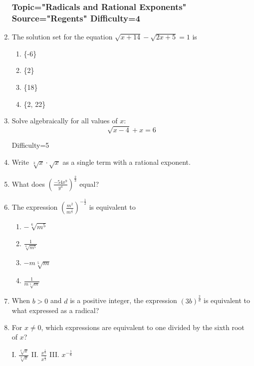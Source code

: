 \documentclass[12pt, oneside]{article}
\begin{document}
\begin{enumerate}
\subsubsection*{Topic="Radicals and Rational Exponents"\\
Source="Regents" 
Difficulty=4}

\item The solution set for the equation $\sqrt{x+14}- \sqrt{2x+5}= 1$ is
\begin{enumerate}
    \item \{-6\}
    \item \{2\}
    \item \{18\}
    \item \{2, 22\}
\end{enumerate} %

\item Solve algebraically for all values of $x$: 
\[\sqrt{x-4}+x=6\] %


Difficulty=5
\item Write $\sqrt[3]x \cdot \sqrt{x}$ as a single term with a rational exponent. %

\item What does $\displaystyle \left( \frac{-54x^9}{y^4} \right)^\frac{2}{3}$ equal? %

\item The expression $\displaystyle \left( \frac{m^2}{m^\frac{1}{3}}\right)^{-\frac{1}{2}}$ is equivalent to 
\begin{enumerate}
    \item $-\sqrt[6]{m^5}$
    \item $\displaystyle \frac{1}{\sqrt[6]{m^5}}$
    \item $-m \sqrt[5]{m}$
    \item $\displaystyle \frac{1}{m \sqrt[5]{m}}$
\end{enumerate} %

\item When $b>0$ and $d$ is a positive integer, the expression $\displaystyle \left(3b \right)^\frac{2}{d}$ is equivalent to what expressed as a radical? %


\item For $x \neq 0$, which expressions are equivalent to one divided by the sixth root of $x$?
\begin{center}
    I. $\frac{\sqrt[6]{x}}{\sqrt[3]{x}}$ \qquad  II. $\displaystyle \frac{x^\frac{1}{6}}{x^\frac{1}{3}}$  \qquad  III. $x^{-\frac{1}{6}}$
\end{center}



\end{enumerate}
\end{document}
